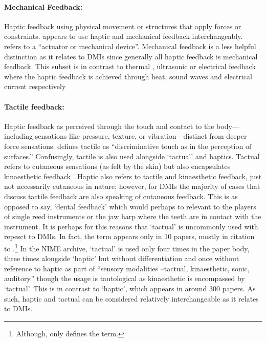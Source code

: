 \paragraph{Mechanical Feedback:} Haptic feedback using physical movement or
structures that apply forces or constraints. \textcite{rovan_typology_2000}
appears to use haptic and mechanical feedback interchangeably.
\textcite{hayes_vibrotactile_2011} refers to a ``actuator or mechanical
device''. Mechanical feedback is a less helpful distinction as it relates to
DMIs since generally all haptic feedback is mechanical feedback. This subset is
in contrast to thermal \cite{miyashita_thermoscore_2004}, ultrasonic \cite{hwang_airpiano_2017} or electrical \cite{altinsoy_electrotactile_2011} feedback where the haptic
feedback is achieved through heat, sound waves and electrical current respectively

\paragraph{Tactile feedback:} Haptic feedback as perceived through the touch and
contact to the body—including sensations like pressure, texture, or
vibration—distinct from deeper force sensations. \textcite{rovan_typology_2000}
defines tactile as ``discriminative touch as in the perception of surfaces.''
Confusingly, tactile is also used alongside `tactual' and haptics. Tactual
refers to cutaneous sensations (as felt by the skin) but also encapsulates
kinaesthetic feedback \cite{bongers_tactual_1998}. Haptic also refers to tactile
and kinaesthetic feedback, just not necessarily cutaneous in nature; however,
for DMIs the majority of cases that discuss tactile feedback are also speaking
of cutaneous feedback. This is as opposed to say, `dental feedback' which would
perhaps to relevant to the players of single reed instruments or the jaw harp
where the teeth are in contact with the instrument. It is perhaps for this
reasons that `tactual' is uncommonly used with repesct to DMIs. In fact, the
term appears only in 10 papers, mostly in citation to
\cites[x1][]{sherrick_scale_1985}[x4][]{bongers_tactual_1998}[x2][]{tan_multifinger_1996}.\footnote{Although,
only \textcite{bongers_tactual_1998} defines the term.} In the NIME archive,
`tactual' is used only four times in the paper body, three times alongside
`haptic' but without differentiation
\cite{gunther_multi_2002,pardue_hand_2013,spapetti_multi_2015} and once without
reference to haptic \cite{ferris_musical_2002} as part of ``sensory modalities
--tactual, kinaesthetic, sonic, auditory.'' though the usage is tautological as
kinaesthetic is encompassed by `tactual'. This is in contrast to `haptic', which
appears in around 300 papers. As such, haptic and tactual can be considered
relatively interchangeable as it relates to DMIs.

